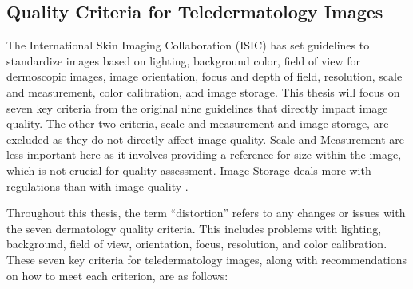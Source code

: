 \subsection{Quality Criteria for Teledermatology Images}
\label{sub:QualityCriteriaTeledermatology}
The International Skin Imaging Collaboration (ISIC) has set guidelines to standardize images based on lighting, background color, field of view for dermoscopic images, image orientation, focus and depth of field, resolution, scale and measurement, color calibration, and image storage. This thesis will focus on seven key criteria from the original nine guidelines that directly impact image quality. The other two criteria, scale and measurement and image storage, are excluded as they do not directly affect image quality. Scale and Measurement are less important here as it involves providing a reference for size within the image, which is not crucial for quality assessment. Image Storage deals more with regulations than with image quality \autocite{TDCriteria}. \par
\vspace{\baselineskip}
\noindent
Throughout this thesis, the term “distortion” refers to any changes or issues with the seven dermatology quality criteria. This includes problems with lighting, background, field of view, orientation, focus, resolution, and color calibration. These seven key criteria for teledermatology images, along with recommendations on how to meet each criterion, are as follows: \par
\clearpage
